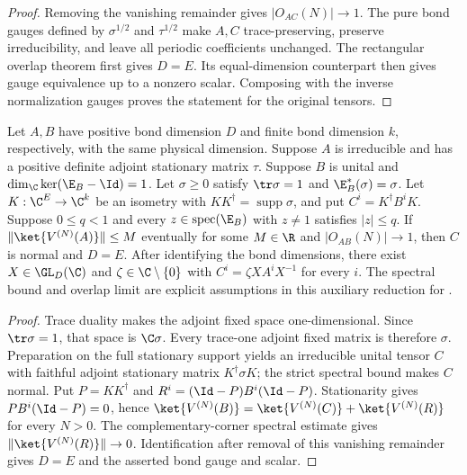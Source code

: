 \begin{proof}\leanok
    Removing the vanishing remainder gives $|O_{AC}(N)|\to1$.
    The pure bond gauges defined by $\sigma^{1/2}$ and $\tau^{1/2}$
    make $A,C$ trace-preserving, preserve irreducibility, and leave
    all periodic coefficients unchanged.
    The rectangular overlap theorem first gives $D=E$.
    Its equal-dimension counterpart then gives gauge equivalence up to a
    nonzero scalar. Composing with the inverse normalization gauges
    proves the statement for the original tensors.
\end{proof}

\begin{lemma}
    \label{thm:spc_aux_stationary_support_identification}
    \leanok
    Let $A,B$ have positive bond dimension $D$ and finite bond dimension $k$,
    respectively, with the same physical dimension. Suppose $A$ is irreducible
    and has a positive definite adjoint stationary matrix $\tau$.
    Suppose $B$ is unital and $\dim_{\C}\ker(\E_B-\Id)=1$.
    Let $\sigma\geq0$ satisfy $\tr\sigma=1$ and $\E_B^*(\sigma)=\sigma$.
    Let $K:\C^E\to\C^k$ be an isometry with
    $KK^\dagger=\operatorname{supp}\sigma$, and put $C^i=K^\dagger B^iK$.
    Suppose $0\leq q<1$ and every $z\in\operatorname{spec}(\E_B)$ with
    $z\ne1$ satisfies $|z|\leq q$.
    If $\|\ket{V^{(N)}(A)}\|\leq M$ eventually for some $M\in\R$ and
    $|O_{AB}(N)|\to1$, then $C$ is normal and $D=E$.
    After identifying the bond dimensions, there exist $X\in\GL_D(\C)$ and
    $\zeta\in\C\setminus\{0\}$ with $C^i=\zeta XA^iX^{-1}$ for every $i$.
    The spectral bound and overlap limit are explicit assumptions in this
    auxiliary reduction for
    \cite[Appendix~C, lines~2653--2717]{Schuch2011Phases}.
\end{lemma}

\begin{proof}\leanok
    Trace duality makes the adjoint fixed space one-dimensional.
    Since $\tr\sigma=1$, that space is $\C\sigma$.
    Every trace-one adjoint fixed matrix is therefore $\sigma$.
    Preparation on the full stationary support yields an irreducible unital
    tensor $C$ with faithful adjoint stationary matrix $K^\dagger\sigma K$;
    the strict spectral bound makes $C$ normal.
    Put $P=KK^\dagger$ and $R^i=(\Id-P)B^i(\Id-P)$.
    Stationarity gives $PB^i(\Id-P)=0$, hence
    $\ket{V^{(N)}(B)}=\ket{V^{(N)}(C)}+\ket{V^{(N)}(R)}$ for every $N>0$.
    The complementary-corner spectral estimate gives
    $\|\ket{V^{(N)}(R)}\|\to0$.
    Identification after removal of this vanishing remainder gives
    $D=E$ and the asserted bond gauge and scalar.
\end{proof}

